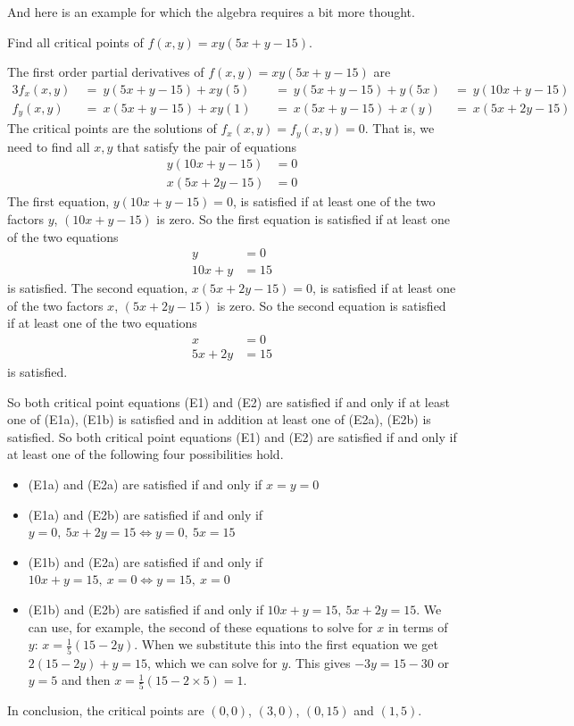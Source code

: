 And here is an example for which the algebra requires a bit more thought.

\begin{eg}[$f(x,y) = xy(5x+y-15)$]\label{eg:MXMNlocalC}
Find all critical points of $f(x,y)=xy(5x+y-15) $.


\soln 
The first order partial derivatives of $f(x,y)=xy(5x+y-15)$ are
\begin{alignat*}{3}
f_x(x,y)
&\ =\ y(5x+y-15)+xy(5)
&&\ =\ y(5x+y-15)+y(5x)
&\ =\  y(10x+y-15)
\\
f_y(x,y)
&\ =\ x(5x+y-15)+xy(1)
&&\ =\ x(5x+y-15)+ x(y)
&\ =\ x(5x+2y-15)
\end{alignat*}
The critical points are the solutions of $f_x(x,y)=f_y(x,y)=0$.
That is, we need to find all $x,y$ that satisfy the pair of equations
\begin{align*}
         y(10x+y-15)&=0\tag{E1} \\
         x(5x+2y-15)&=0\tag{E2}
\end{align*}
The first equation, $y(10x+y-15)=0$, is satisfied if at least one of the
two factors $y$, $(10x+y-15)$ is zero. So the first equation is satisfied 
if at least one of the two equations
\begin{subequations}
\begin{align*}
y&=0 \tag{E1a}\\
10x+y&=15 \tag{E1b}
\end{align*}
\end{subequations}
is satisfied.
The second equation, $x(5x+2y-15)=0$, is satisfied if at least one of the two
factors $x$, $(5x+2y-15)$ is zero. So the second equation is satisfied 
if at least one of the two equations
\begin{subequations}
\begin{align*}
x&=0 \tag{E2a}\\
5x+2y&=15 \tag{E2b}
\end{align*}
\end{subequations}
is satisfied.

So both critical point equations (E1) and (E2) are satisfied
if and only if at least one of (E1a), (E1b) is satisfied
and in addition at least one of (E2a), (E2b) is satisfied.
So both critical point equations (E1) and (E2) are satisfied
if and only if at least one of the following four possibilities hold.
\begin{itemize}
\item 
(E1a) and (E2a) are satisfied
if and only if $x=y=0$
\item 
(E1a) and (E2b) are satisfied
if and only if $y=0,\ 5x+2y=15 \iff y=0,\ 5x=15$
\item 
(E1b) and (E2a) are satisfied
if and only if $10x+y=15,\ x=0 \iff y=15,\ x=0$
\item 
(E1b) and (E2b) are satisfied
if and only if $10x+y=15,\ 5x+2y=15$. We can use, for example, the second
of these equations to solve for $x$ in terms of $y$: $x =\frac{1}{5}(15-2y)$.
When we substitute this into the first equation we get $2(15-2y)+y=15$,
which we can solve for $y$. This gives $-3y=15-30$ or $y=5$ and then
$x=\frac{1}{5}(15-2\times 5)=1$.
\end{itemize}
In conclusion, the critical points are $(0,0)$, $(3,0)$, $(0,15)$ and
$(1,5)$.


\end{eg}
